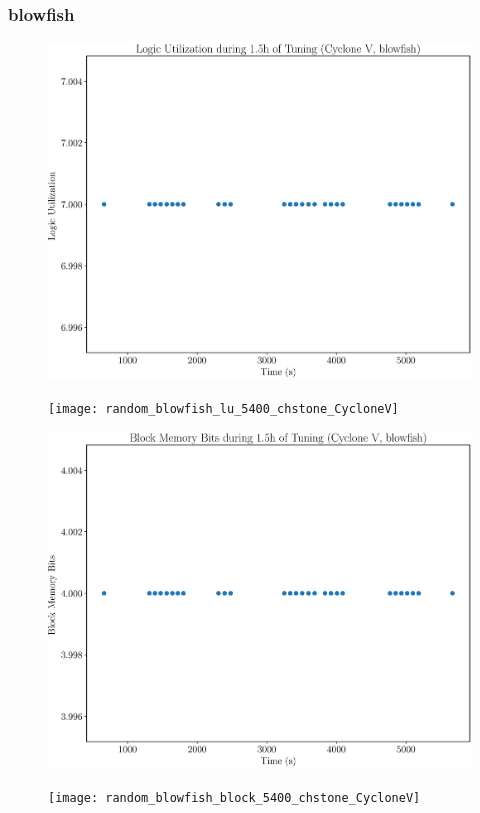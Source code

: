 \documentclass[12pt, a4paper]{article}
\begin{document}
\newpage

\subsubsection{blowfish}

\begin{figure}[htpb]
    \centering
    \noindent
    \begin{minipage}{.48\textwidth}
        \centering
        \includegraphics[scale=.25]{blowfish_lu_5400_chstone_CycloneV}
    \end{minipage}%
    \hfill
    \begin{minipage}{.48\textwidth}
        \centering
        \texttt{[image: random\_blowfish\_lu\_5400\_chstone\_CycloneV]}
    \end{minipage}%

    \begin{minipage}{.48\textwidth}
        \includegraphics[scale=.25]{blowfish_block_5400_chstone_CycloneV}
    \end{minipage}%
    \hfill
    \begin{minipage}{.48\textwidth}
        \texttt{[image: random\_blowfish\_block\_5400\_chstone\_CycloneV]}
    \end{minipage}%


\end{figure}
\end{document}
